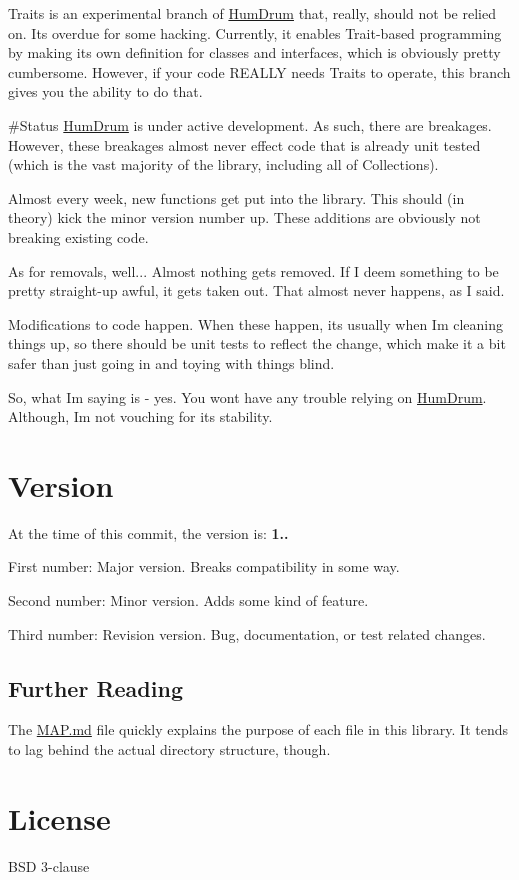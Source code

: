 Traits is an experimental branch of \hyperlink{namespaceHumDrum}{Hum\+Drum} that, really, should not be relied on. It\textquotesingle{}s overdue for some hacking. Currently, it enables Trait-\/based programming by making its own definition for classes and interfaces, which is obviously pretty cumbersome. However, if your code R\+E\+A\+L\+LY needs Traits to operate, this branch gives you the ability to do that.

\#\+Status \hyperlink{namespaceHumDrum}{Hum\+Drum} is under active development. As such, there are breakages. However, these breakages almost never effect code that is already unit tested (which is the vast majority of the library, including all of Collections).

Almost every week, new functions get put into the library. This should (in theory) kick the minor version number up. These additions are obviously not breaking existing code.

As for removals, well... Almost nothing gets removed. If I deem something to be pretty straight-\/up awful, it gets taken out. That almost never happens, as I said.

Modifications to code happen. When these happen, it\textquotesingle{}s usually when I\textquotesingle{}m cleaning things up, so there should be unit tests to reflect the change, which make it a bit safer than just going in and toying with things blind.

So, what I\textquotesingle{}m saying is -\/ yes. You won\textquotesingle{}t have any trouble relying on \hyperlink{namespaceHumDrum}{Hum\+Drum}. Although, I\textquotesingle{}m not vouching for its stability.

\section*{Version}

At the time of this commit, the version is\+: {\bfseries 1..}
\begin{DoxyItemize}
\item First number\+: Major version. Breaks compatibility in some way.
\item Second number\+: Minor version. Adds some kind of feature.
\item Third number\+: Revision version. Bug, documentation, or test related changes.
\end{DoxyItemize}

\subsection*{Further Reading}

The \hyperlink{MAP_8md_source}{M\+A\+P.\+md} file quickly explains the purpose of each file in this library. It tends to lag behind the actual directory structure, though.

\section*{License}

B\+SD 3-\/clause 
